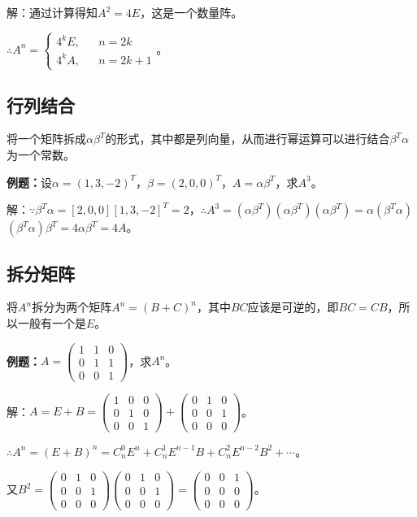 \documentclass[UTF8, 12pt]{ctexart}
\begin{document}
解：通过计算得知$A^2=4E$，这是一个数量阵。\medskip

$\therefore A^n=\left\{\begin{array}{lcl}
    4^kE, & & n=2k \\
    4^kA, & & n=2k+1
\end{array}\right.$。

\subsection{行列结合}

将一个矩阵拆成$\alpha\beta^T$的形式，其中都是列向量，从而进行幂运算可以进行结合$\beta^T\alpha$为一个常数。

\textbf{例题：}设$\alpha=(1,3,-2)^T$，$\beta=(2,0,0)^T$，$A=\alpha\beta^T$，求$A^3$。

解：$\because\beta^T\alpha=[2,0,0][1,3,-2]^T=2$，$\therefore A^3=(\alpha\beta^T)(\alpha\beta^T)(\alpha\beta^T)=\alpha(\beta^T\alpha)$\\$(\beta^T\alpha)\beta^T=4\alpha\beta^T=4A$。

\subsection{拆分矩阵}

将$A^n$拆分为两个矩阵$A^n=(B+C)^n$，其中$BC$应该是可逆的，即$BC=CB$，所以一般有一个是$E$。\medskip

\textbf{例题：}$A=\left(\begin{array}{ccc}
    1 & 1 & 0 \\
    0 & 1 & 1 \\
    0 & 0 & 1
\end{array}\right)$，求$A^n$。\medskip

解：$A=E+B=\left(\begin{array}{ccc}
    1 & 0 & 0 \\
    0 & 1 & 0 \\
    0 & 0 & 1
\end{array}\right)+\left(\begin{array}{ccc}
    0 & 1 & 0 \\
    0 & 0 & 1 \\
    0 & 0 & 0
\end{array}\right)$。\medskip

$\therefore A^n=(E+B)^n=C_n^0E^n+C_n^1E^{n-1}B+C_n^2E^{n-2}B^2+\cdots$。

又$B^2=\left(\begin{array}{ccc}
    0 & 1 & 0 \\
    0 & 0 & 1 \\
    0 & 0 & 0
\end{array}\right)\left(\begin{array}{ccc}
    0 & 1 & 0 \\
    0 & 0 & 1 \\
    0 & 0 & 0
\end{array}\right)=\left(\begin{array}{ccc}
    0 & 0 & 1 \\
    0 & 0 & 0 \\
    0 & 0 & 0
\end{array}\right)$。
\end{document}

